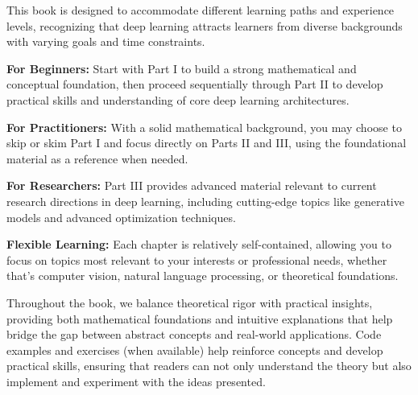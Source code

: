\begin{tcolorbox}[
  colback=softivory,
  colframe=deepcharcoal,
  colbacktitle=deepcharcoal!20,
  coltitle=deepcharcoal,
  boxrule=1.5pt,
  arc=4pt,
  left=15pt,right=15pt,top=15pt,bottom=15pt,
  fonttitle=\bfseries\large,
  title={\textcolor{deepcharcoal}{How to Use This Book}}
]
This book is designed to accommodate different learning paths and experience levels, recognizing that deep learning attracts learners from diverse backgrounds with varying goals and time constraints.

\vspace{8pt}
\textbf{For Beginners:} Start with Part I to build a strong mathematical and conceptual foundation, then proceed sequentially through Part II to develop practical skills and understanding of core deep learning architectures.

\vspace{8pt}
\textbf{For Practitioners:} With a solid mathematical background, you may choose to skip or skim Part I and focus directly on Parts II and III, using the foundational material as a reference when needed.

\vspace{8pt}
\textbf{For Researchers:} Part III provides advanced material relevant to current research directions in deep learning, including cutting-edge topics like generative models and advanced optimization techniques.

\vspace{8pt}
\textbf{Flexible Learning:} Each chapter is relatively self-contained, allowing you to focus on topics most relevant to your interests or professional needs, whether that's computer vision, natural language processing, or theoretical foundations.

\vspace{8pt}
Throughout the book, we balance theoretical rigor with practical insights, providing both mathematical foundations and intuitive explanations that help bridge the gap between abstract concepts and real-world applications. Code examples and exercises (when available) help reinforce concepts and develop practical skills, ensuring that readers can not only understand the theory but also implement and experiment with the ideas presented.
\end{tcolorbox}
